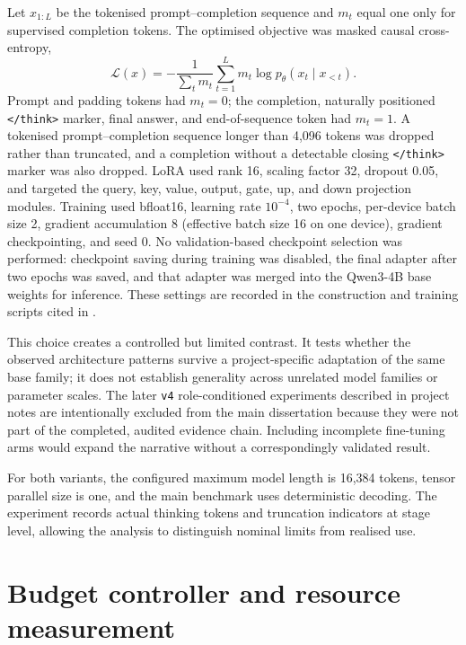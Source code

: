 Let $x_{1:L}$ be the tokenised prompt--completion sequence and $m_t$ equal one only for supervised completion tokens. The optimised objective was masked causal cross-entropy,
\begin{equation}
  \mathcal{L}(x)=-\frac{1}{\sum_t m_t}\sum_{t=1}^{L}m_t\log p_\theta(x_t\mid x_{<t}).
\end{equation}
Prompt and padding tokens had $m_t=0$; the completion, naturally positioned \texttt{</think>} marker, final answer, and end-of-sequence token had $m_t=1$. A tokenised prompt--completion sequence longer than 4,096 tokens was dropped rather than truncated, and a completion without a detectable closing \texttt{</think>} marker was also dropped. LoRA used rank 16, scaling factor 32, dropout 0.05, and targeted the query, key, value, output, gate, up, and down projection modules. Training used bfloat16, learning rate $10^{-4}$, two epochs, per-device batch size 2, gradient accumulation 8 (effective batch size 16 on one device), gradient checkpointing, and seed 0. No validation-based checkpoint selection was performed: checkpoint saving during training was disabled, the final adapter after two epochs was saved, and that adapter was merged into the Qwen3-4B base weights for inference. These settings are recorded in the construction and training scripts cited in .

This choice creates a controlled but limited contrast. It tests whether the observed architecture patterns survive a project-specific adaptation of the same base family; it does not establish generality across unrelated model families or parameter scales. The later \texttt{v4} role-conditioned experiments described in project notes are intentionally excluded from the main dissertation because they were not part of the completed, audited evidence chain. Including incomplete fine-tuning arms would expand the narrative without a correspondingly validated result.

For both variants, the configured maximum model length is 16,384 tokens, tensor parallel size is one, and the main benchmark uses deterministic decoding. The experiment records actual thinking tokens and truncation indicators at stage level, allowing the analysis to distinguish nominal limits from realised use.

\section{Budget controller and resource measurement}

